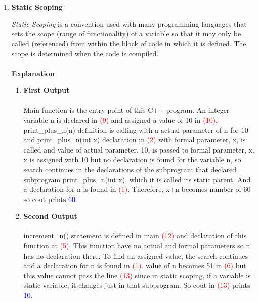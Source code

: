 \documentclass{article}
\begin{document}
\begin{enumerate}[label=\textbf{\alph*)}]
\item \textbf{Static Scoping} 
    
    \textit{Static Scoping} is a convention used with many programming languages that sets the scope (range of functionality) of a variable so that it may only be called (referenced) from within the block of code in which it is defined. The scope is determined when the code is compiled. 
    \\~\\ \textbf{Explanation}  
    \begin{enumerate}[label=\textbf{\alph*)}]
    \item \textbf{First Output} \\~\\
    Main function is the entry point of this C++ program. An integer variable n is declared in \textcolor{red}{(9)} and assigned a value of 10 in \textcolor{red}{(10)}. print\_plus\_n(n) definition is calling with a actual parameter of n for 10 and print\_plus\_n(int x) declaration in \textcolor{red}{(2)} with formal parameter, x, is called and value of actual parameter, 10, is passed to formal parameter, x.
    x is assigned with 10 but no declaration is found for the variable n, so search continues in the declarations of the subprogram that declared subprogram print\_plus\_n(int x), which it is called its static parent. And a declaration for  n is found in \textcolor{red}{(1)}. Therefore, x+n becomes number of 60 so cout prints \textcolor{blue}{60}.\\
    
    \item \textbf{Second Output} 
    \\~\\ increment\_n() statement is defined in main \textcolor{red}{(12)} and declaration of this function at \textcolor{red}{(5)}. This function have no actual and formal parameters so n has no declaration there. To find an assigned value, the search continues and a declaration for  n is found in \textcolor{red}{(1)}. value of n becomes 51 in \textcolor{red}{(6)} but this value cannot pass the line \textcolor{red}{(13)} since in static scoping, if a variable is static variable, it changes just in that subprogram. So cout in \textcolor{red}{(13)} prints \textcolor{blue}{10}.\\
   

\end{enumerate}
\end{enumerate}
\end{document}
